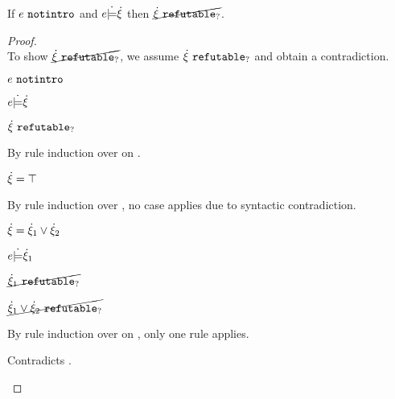 \begin{lemma}
\label{lem:satisfy-not-refutable}
If $e ~\mathtt{notintro}$ and $e \dot{\models} \dot{\xi}$ then $\cancel{\dot{\xi} ~\mathtt{refutable}_?}$.
\end{lemma}
\begin{proof}\mbox{}\\
To show $\cancel{\dot{\xi} ~\mathtt{refutable}_?}$, we assume $\dot{\xi} ~\mathtt{refutable}_?$ and obtain a contradiction.
\begin{pfsteps*}
\item $e ~\mathtt{notintro}$  
\item $e \dot{\models} \dot{\xi}$  
\item $\dot{\xi} ~\mathtt{refutable}_?$  
\end{pfsteps*}
By rule induction over  on .
\begin{byCases}
\item[\text{(\ref{rule:CSTruth})}]
    \begin{pfsteps*}
    \item $\dot{\xi}=\top$ 
    \end{pfsteps*}
    By rule induction over , no case applies due to syntactic contradiction.
\item[\text{(\ref{rule:CSOr1})}]
    \begin{pfsteps*}
    \item $\dot{\xi}=\dot{\xi}_1 \vee \dot{\xi}_2$ 
    \item $e \dot{\models} \dot{\xi}_1$  
    \item $\cancel{\dot{\xi}_1 ~\mathtt{refutable}_?}$  
    \item $\cancel{\dot{\xi}_1 \vee \dot{\xi}_2 ~\mathtt{refutable}_?}$ 
    \end{pfsteps*}
    By rule induction over  on , only one rule applies.
    \begin{byCases}
      \item[\text{(\ref{rule:RXOr})}]
      \begin{pfsteps}
      \item {} 
      \end{pfsteps} 
      Contradicts .
    \end{byCases}

\end{byCases}
\end{proof}
